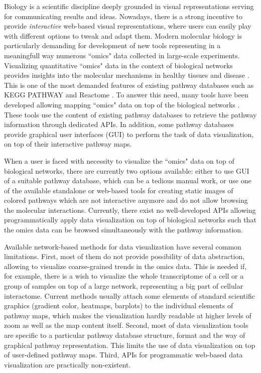\documentclass[a4,center,fleqn]{NAR}
\begin{document}
Biology is a scientific discipline deeply grounded in visual representations
serving for communicating results and ideas. Nowadays, there is a strong
incentive to provide \emph{interactive} web-based visual representations, where
users can easily play with different options to tweak and adapt them. Modern
molecular biology is particularly demanding for development of new tools
representing in a meaningfull way numerous ``omics" data collected in
large-scale experiments. Visualizing quantitative ``omics" data in the context
of biological networks provides insights into the molecular mechanisms in
healthy tissues and disease \cite{Gehlenborg2010,Barillot2012}. This is one of
the most demanded features of existing pathway databases such as KEGG PATHWAY
and Reactome \cite{Kanehisa2012, Croft2014}. To answer this need, many tools
have been developed allowing mapping ``omics" data on top of the biological
networks \cite{Arakawa2005,vanIersel2008,Luo2013, Nishida2014}. These tools use
the content of existing pathway databases to retrieve the pathway information
through dedicated APIs. In addition, some pathway databases provide graphical
user interfaces (GUI) to perform the task of data visualization, on top of
their interactive pathway maps.

When a user is faced with necessity to visualize the ``omics" data on top of
biological networks, there are currently two options available: either to use
GUI of a suitable pathway database, which can be a tedious manual work, or use
one of the available standalone or web-based tools for creating static images
of colored pathways which are not interactive anymore and do not allow browsing
the molecular interactions. Currently, there exist no well-developed APIs
allowing programmatically apply data visualization on top of biological
networks such that the omics data can be browsed simultaneously with the
pathway information.

Available network-based methods for data visualization have several common
limitations. First, most of them do not provide possibility of data
abstraction, allowing to visualize coarse-grained trends in the omics data.
This is needed if, for example, there is a wish to visualize the whole
transcriptome of a cell or a group of samples on top of a large network,
representing a big part of cellular interactome. Current methods usually attach
some elements of standard scientific graphics (gradient color, heatmaps,
barplots) to the individual elements of pathway maps, which makes the
visualization hardly readable at higher levels of zoom as well as the map
content itself. Second, most of data visualization tools are specific to a
particular pathway database structure, format and the way of graphical pathway
representation. This limits the use of data visualization on top of
user-defined pathway maps. Third, APIs for programmatic web-based data
visualization are practically non-existent.
\end{document}
